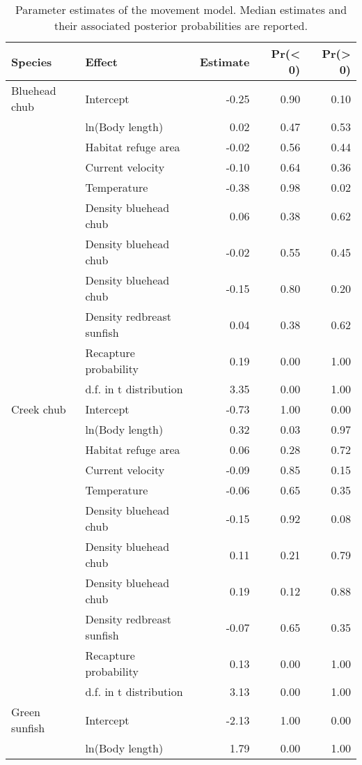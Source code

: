 \begin{table}[ht]
\centering
\caption{Parameter estimates of the movement model.
             Median estimates and their associated posterior probabilities are reported.} 
\label{tab:coefficients}
\begin{tabular}{llrrr}
  \hline
Species & Effect & Estimate & Pr(< 0) & Pr(> 0) \\ 
  \hline
Bluehead chub & Intercept & -0.25 & 0.90 & 0.10 \\ 
   & ln(Body length) & 0.02 & 0.47 & 0.53 \\ 
   & Habitat refuge area & -0.02 & 0.56 & 0.44 \\ 
   & Current velocity & -0.10 & 0.64 & 0.36 \\ 
   & Temperature & -0.38 & 0.98 & 0.02 \\ 
   & Density bluehead chub & 0.06 & 0.38 & 0.62 \\ 
   & Density bluehead chub & -0.02 & 0.55 & 0.45 \\ 
   & Density bluehead chub & -0.15 & 0.80 & 0.20 \\ 
   & Density redbreast sunfish & 0.04 & 0.38 & 0.62 \\ 
   & Recapture probability & 0.19 & 0.00 & 1.00 \\ 
   & d.f. in t distribution & 3.35 & 0.00 & 1.00 \\ 
  Creek chub & Intercept & -0.73 & 1.00 & 0.00 \\ 
   & ln(Body length) & 0.32 & 0.03 & 0.97 \\ 
   & Habitat refuge area & 0.06 & 0.28 & 0.72 \\ 
   & Current velocity & -0.09 & 0.85 & 0.15 \\ 
   & Temperature & -0.06 & 0.65 & 0.35 \\ 
   & Density bluehead chub & -0.15 & 0.92 & 0.08 \\ 
   & Density bluehead chub & 0.11 & 0.21 & 0.79 \\ 
   & Density bluehead chub & 0.19 & 0.12 & 0.88 \\ 
   & Density redbreast sunfish & -0.07 & 0.65 & 0.35 \\ 
   & Recapture probability & 0.13 & 0.00 & 1.00 \\ 
   & d.f. in t distribution & 3.13 & 0.00 & 1.00 \\ 
  Green sunfish & Intercept & -2.13 & 1.00 & 0.00 \\ 
   & ln(Body length) & 1.79 & 0.00 & 1.00 \\ 

\end{tabular}
\end{table}
